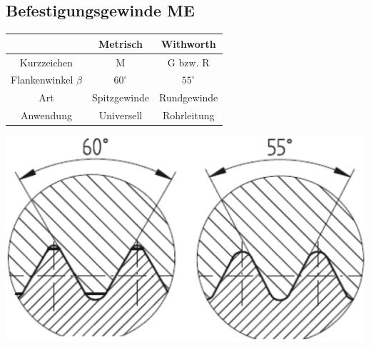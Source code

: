 \subsection{Befestigungsgewinde \hfill ME}
\begin{minipage}{0.58\linewidth}
    \begin{center}
        \begin{scriptsize}
            \begin{tabular}{|c|c|c|}
            \hline
            \null & \cellcolor{Yellow}Metrisch & \cellcolor{Apricot}Withworth\\
            \hline
            Kurzzeichen & M & G bzw. R \\
            \hline
            Flankenwinkel $\beta$ & $60^\circ$ & $55^\circ$ \\
            \hline
            Art & Spitzgewinde & Rundgewinde \\
            \hline
            Anwendung & Universell & Rohrleitung\\
            \hline
        \end{tabular}
        \end{scriptsize}
    \end{center}
\end{minipage}
\begin{minipage}{0.4\linewidth}
    \begin{center}
        \includegraphics[width = 0.9\linewidth]{MAEIP_BG}
    \end{center}
\end{minipage}